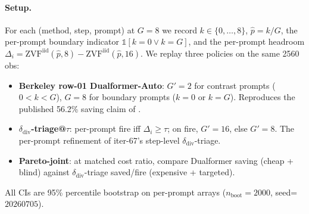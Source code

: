 \paragraph{Setup.}
For each (method, step, prompt) at $G{=}8$ we record
$k \in \{0,\ldots,8\}$, $\hat{p}{=}k/G$, the per-prompt boundary
indicator $\mathbb{1}[k{=}0 \vee k{=}G]$, and the per-prompt headroom
$\Delta_i = \mathrm{ZVF}^{\mathrm{iid}}(\hat{p}, 8) -
\mathrm{ZVF}^{\mathrm{iid}}(\hat{p}, 16)$.
We replay three policies on the same 2560 obs:
\begin{itemize}
    \item \textbf{Berkeley row-01 Dualformer-Auto}:
        $G'{=}2$ for contrast prompts ($0 < k < G$), $G{=}8$ for
        boundary prompts ($k{=}0$ or $k{=}G$). Reproduces the
        published 56.2\% saving claim of
        \citet{su2024dualformer}.
    \item \textbf{$\delta_{\mathrm{div}}$-triage@$\tau$}:
        per-prompt fire iff $\Delta_i \geq \tau$; on fire,
        $G'{=}16$, else $G'{=}8$. The per-prompt refinement
        of iter-67's step-level $\delta_{\mathrm{div}}$-triage.
    \item \textbf{Pareto-joint}:
        at matched cost ratio, compare Dualformer saving
        (cheap + blind) against $\delta_{\mathrm{div}}$-triage
        saved/fire (expensive + targeted).
\end{itemize}
All CIs are 95\% percentile bootstrap on per-prompt arrays
($n_{\mathrm{boot}}{=}2000$, seed=$20260705$).

